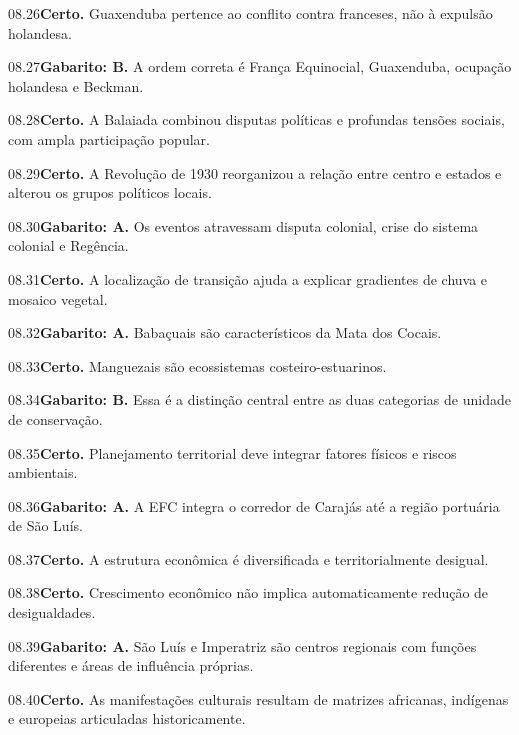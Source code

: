 \begin{solucao}{08.26}\textbf{Certo.} Guaxenduba pertence ao conflito contra franceses, não à expulsão holandesa.\end{solucao}
\begin{solucao}{08.27}\textbf{Gabarito: B.} A ordem correta é França Equinocial, Guaxenduba, ocupação holandesa e Beckman.\end{solucao}
\begin{solucao}{08.28}\textbf{Certo.} A Balaiada combinou disputas políticas e profundas tensões sociais, com ampla participação popular.\end{solucao}
\begin{solucao}{08.29}\textbf{Certo.} A Revolução de 1930 reorganizou a relação entre centro e estados e alterou os grupos políticos locais.\end{solucao}
\begin{solucao}{08.30}\textbf{Gabarito: A.} Os eventos atravessam disputa colonial, crise do sistema colonial e Regência.\end{solucao}
\begin{solucao}{08.31}\textbf{Certo.} A localização de transição ajuda a explicar gradientes de chuva e mosaico vegetal.\end{solucao}
\begin{solucao}{08.32}\textbf{Gabarito: A.} Babaçuais são característicos da Mata dos Cocais.\end{solucao}
\begin{solucao}{08.33}\textbf{Certo.} Manguezais são ecossistemas costeiro-estuarinos.\end{solucao}
\begin{solucao}{08.34}\textbf{Gabarito: B.} Essa é a distinção central entre as duas categorias de unidade de conservação.\end{solucao}
\begin{solucao}{08.35}\textbf{Certo.} Planejamento territorial deve integrar fatores físicos e riscos ambientais.\end{solucao}
\begin{solucao}{08.36}\textbf{Gabarito: A.} A EFC integra o corredor de Carajás até a região portuária de São Luís.\end{solucao}
\begin{solucao}{08.37}\textbf{Certo.} A estrutura econômica é diversificada e territorialmente desigual.\end{solucao}
\begin{solucao}{08.38}\textbf{Certo.} Crescimento econômico não implica automaticamente redução de desigualdades.\end{solucao}
\begin{solucao}{08.39}\textbf{Gabarito: A.} São Luís e Imperatriz são centros regionais com funções diferentes e áreas de influência próprias.\end{solucao}
\begin{solucao}{08.40}\textbf{Certo.} As manifestações culturais resultam de matrizes africanas, indígenas e europeias articuladas historicamente.\end{solucao}

